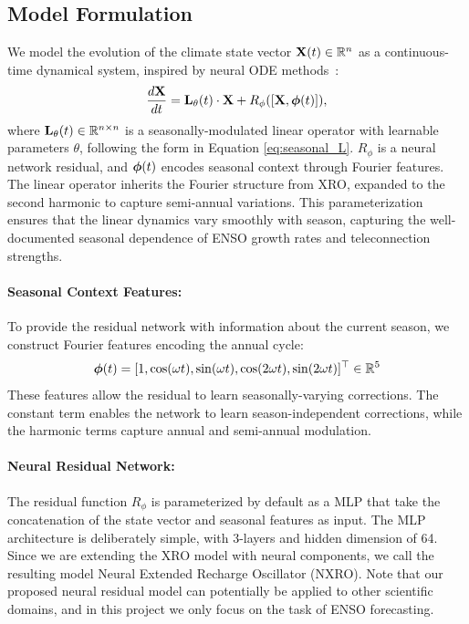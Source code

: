 \subsection{Model Formulation}

We model the evolution of the climate state vector $\mathbf{X}(t) \in \mathbb{R}^n$ as a continuous-time dynamical system, inspired by neural ODE methods~\cite{chen2018neuralode, huang2023generalizinggraphodelearning}:
\begin{equation}
    \frac{d\mathbf{X}}{dt} = \mathbf{L}_\theta(t) \cdot \mathbf{X} + R_\phi([\mathbf{X}, \boldsymbol{\phi}(t)]),
    \label{eq:nxro_main}
\end{equation}
where $\mathbf{L}_\theta(t) \in \mathbb{R}^{n \times n}$ is a seasonally-modulated linear operator with learnable parameters $\theta$, following the form in Equation \ref{eq:seasonal_L}. $R_\phi$ is a neural network residual, and $\boldsymbol{\phi}(t)$ encodes seasonal context through Fourier features. The linear operator inherits the Fourier structure from XRO, expanded to the second harmonic to capture semi-annual variations. This parameterization ensures that the linear dynamics vary smoothly with season, capturing the well-documented seasonal dependence of ENSO growth rates and teleconnection strengths.
\paragraph{Seasonal Context Features:} To provide the residual network with information about the current season, we construct Fourier features encoding the annual cycle:
\begin{equation}
    \boldsymbol{\phi}(t) = [1, \cos(\omega t), \sin(\omega t), \cos(2\omega t), \sin(2\omega t)]^\top \in \mathbb{R}^5
\end{equation}
These features allow the residual to learn seasonally-varying corrections. The constant term enables the network to learn season-independent corrections, while the harmonic terms capture annual and semi-annual modulation.

\paragraph{Neural Residual Network:} The residual function $R_\phi$ is parameterized by default as a MLP that take the concatenation of the state vector and seasonal features as input.  The MLP architecture is deliberately simple, with 3-layers and hidden dimension of 64. Since we are extending the XRO model with neural components, we call the resulting model Neural Extended Recharge Oscillator (NXRO). Note that our proposed neural residual model can potentially be applied to other scientific domains, and in this project we only focus on the task of ENSO forecasting.


